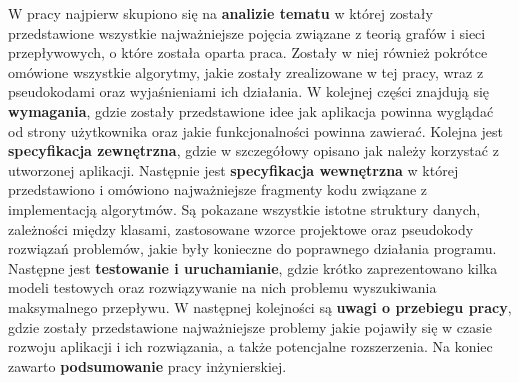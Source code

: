 W pracy najpierw skupiono się na \textbf{analizie tematu} w której zostały przedstawione wszystkie najważniejsze pojęcia związane z teorią grafów i sieci przepływowych, o które została oparta praca. Zostały w niej również pokrótce omówione wszystkie algorytmy, jakie zostały zrealizowane w tej pracy, wraz z pseudokodami oraz wyjaśnieniami ich działania. W kolejnej części znajdują się \textbf{wymagania}, gdzie zostały przedstawione idee jak aplikacja powinna wyglądać od strony użytkownika oraz jakie funkcjonalności powinna zawierać. Kolejna jest \textbf{specyfikacja zewnętrzna}, gdzie w szczegółowy opisano jak należy korzystać z utworzonej aplikacji. Następnie jest \textbf{specyfikacja wewnętrzna} w której przedstawiono i omówiono najważniejsze fragmenty kodu związane z implementacją algorytmów. Są pokazane wszystkie istotne struktury danych, zależności między klasami, zastosowane wzorce projektowe oraz pseudokody rozwiązań problemów, jakie były konieczne do poprawnego działania programu. Następne jest \textbf{testowanie i uruchamianie}, gdzie krótko zaprezentowano kilka modeli testowych oraz rozwiązywanie na nich problemu wyszukiwania maksymalnego przepływu. W następnej kolejności są \textbf{uwagi o przebiegu pracy}, gdzie zostały przedstawione najważniejsze problemy jakie pojawiły się w czasie rozwoju aplikacji i ich rozwiązania, a także potencjalne rozszerzenia. Na koniec zawarto \textbf{podsumowanie} pracy inżynierskiej.
